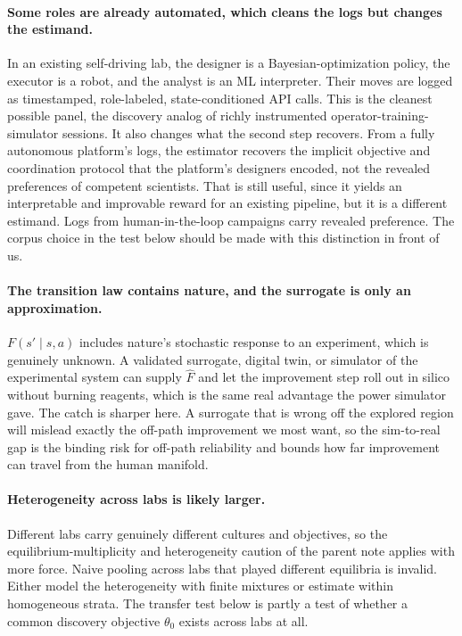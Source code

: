 \documentclass[11pt]{article}
\theoremstyle{definition}
\begin{document}
\paragraph{Some roles are already automated, which cleans the logs but changes the estimand.}
In an existing self-driving lab, the designer is a Bayesian-optimization policy, the executor is a robot, and the analyst is an ML interpreter. Their moves are logged as timestamped, role-labeled, state-conditioned API calls. This is the cleanest possible panel, the discovery analog of richly instrumented operator-training-simulator sessions. It also changes what the second step recovers. From a fully autonomous platform's logs, the estimator recovers the implicit objective and coordination protocol that the platform's designers encoded, not the revealed preferences of competent scientists. That is still useful, since it yields an interpretable and improvable reward for an existing pipeline, but it is a different estimand. Logs from human-in-the-loop campaigns carry revealed preference. The corpus choice in the test below should be made with this distinction in front of us.

\paragraph{The transition law contains nature, and the surrogate is only an approximation.}
$F(s'\mid s,a)$ includes nature's stochastic response to an experiment, which is genuinely unknown. A validated surrogate, digital twin, or simulator of the experimental system can supply $\hat F$ and let the improvement step roll out in silico without burning reagents, which is the same real advantage the power simulator gave. The catch is sharper here. A surrogate that is wrong off the explored region will mislead exactly the off-path improvement we most want, so the sim-to-real gap is the binding risk for off-path reliability and bounds how far improvement can travel from the human manifold.

\paragraph{Heterogeneity across labs is likely larger.}
Different labs carry genuinely different cultures and objectives, so the equilibrium-multiplicity and heterogeneity caution of the parent note applies with more force. Naive pooling across labs that played different equilibria is invalid. Either model the heterogeneity with finite mixtures \citep{arcidiaconoMiller2011} or estimate within homogeneous strata. The transfer test below is partly a test of whether a common discovery objective $\theta_0$ exists across labs at all.
\end{document}

